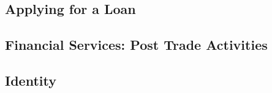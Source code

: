 \subsection{Applying for a Loan}




\subsection{Financial Services: Post Trade Activities}




\subsection{Identity}
